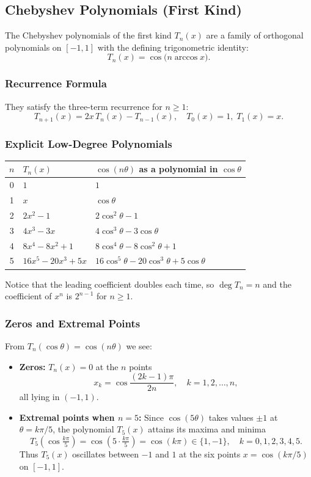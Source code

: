 \documentclass[12pt]{article}
\begin{document}
\subsection{Chebyshev Polynomials (First Kind)}
The Chebyshev polynomials of the first kind $T_n(x)$ are a family of orthogonal polynomials on $[-1,1]$ with the defining trigonometric identity:
\[ T_n(x) = \cos\big(n\arccos x\big). \]

\subsubsection{Recurrence Formula}
They satisfy the three-term recurrence for $n\ge 1$:
\[ T_{n+1}(x) = 2x\,T_n(x) - T_{n-1}(x), \quad T_0(x)=1,\; T_1(x)=x. \]

\subsubsection{Explicit Low-Degree Polynomials}
\begin{center}
\begin{tabular}{c|l|l}
  $n$ & $T_n(x)$ & $\cos(n\theta)$ as a polynomial in $\cos\theta$ \\ \hline
  0 & $1$ & $1$ \\
  1 & $x$ & $\cos\theta$ \\
  2 & $2x^2 - 1$ & $2\cos^2\theta - 1$ \\
  3 & $4x^3 - 3x$ & $4\cos^3\theta - 3\cos\theta$ \\
  4 & $8x^4 - 8x^2 + 1$ & $8\cos^4\theta - 8\cos^2\theta + 1$ \\
  5 & $16x^5 - 20x^3 + 5x$ & $16\cos^5\theta - 20\cos^3\theta + 5\cos\theta$
\end{tabular}
\end{center}
Notice that the leading coefficient doubles each time, so $\deg T_n = n$ and the coefficient of $x^n$ is $2^{n-1}$ for $n\ge1$.

\subsubsection{Zeros and Extremal Points}
From $T_n(\cos\theta) = \cos(n\theta)$ we see:
\begin{itemize}[leftmargin=*]
  \item \textbf{Zeros:} $T_n(x) = 0$ at the $n$ points
  \[
    x_k = \cos\frac{(2k-1)\pi}{2n}, \quad k = 1,2,\dots,n,
  \]
  all lying in $(-1,1)$.
  \item \textbf{Extremal points when $n=5$:} Since $\cos(5\theta)$ takes values $\pm1$ at $\theta = k\pi/5$, the polynomial $T_5(x)$ attains its maxima and minima
  \[
    T_5(\cos\tfrac{k\pi}{5}) = \cos(5\cdot\tfrac{k\pi}{5}) = \cos(k\pi) \in \{1,-1\},\quad k=0,1,2,3,4,5.
  \]
  Thus $T_5(x)$ oscillates between $-1$ and $1$ at the six points $x = \cos(k\pi/5)$ on $[-1,1]$.
\end{itemize}
\end{document}
